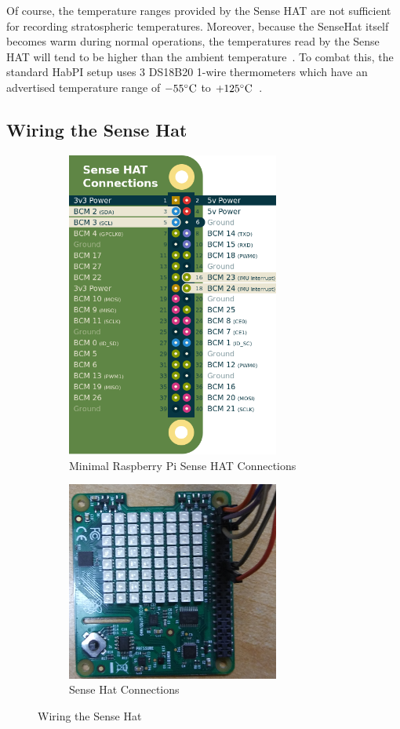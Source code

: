 \documentclass[journal]{new-aiaa}
\begin{document}
Of course, the temperature ranges provided by the Sense HAT are not
sufficient for recording stratospheric temperatures.  Moreover,
because the SenseHat itself becomes warm during normal operations, the
temperatures read by the Sense HAT will tend to be higher than the
ambient temperature~\cite{SenseHat-API}.  To combat this, the standard
HabPI setup uses 3 DS18B20 1-wire thermometers which have an
advertised temperature range of $-55\celsius$ to
$+125\celsius$~\cite{DS18B20}.

\subsection{Wiring the Sense Hat}
\begin{figure}
    \centering
    \begin{subfigure}{.45\textwidth}
        \centering
        \includegraphics[width=2.75in]{images/rpi-sensehat}
        \caption{Minimal Raspberry Pi Sense HAT
        Connections~\cite{pinout}}
        \label{fig:pinout}
    \end{subfigure}
    \begin{subfigure}{.45\textwidth}
        \centering
        \includegraphics[width=2.75in]{images/sensehat}
        \caption{Sense Hat Connections}
        \label{fig:hat}
    \end{subfigure}
    \caption{Wiring the Sense Hat}
    \label{fig:hatwiring}
\end{figure}
\end{document}
